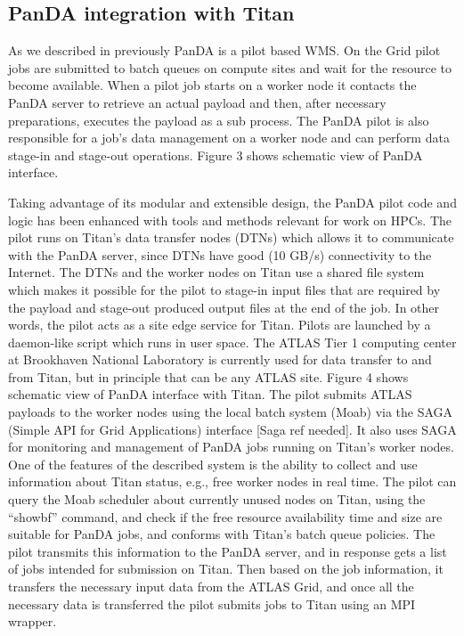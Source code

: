 \subsection{PanDA integration with Titan}
\label{subsec:integration}

As we described in previously PanDA is a pilot based WMS. On the Grid pilot
jobs are submitted to batch queues on compute sites and wait for the resource
to become available. When a pilot job starts on a worker node it contacts the
PanDA server to retrieve an actual payload and then, after necessary
preparations, executes the payload as a sub process. The PanDA pilot is also
responsible for a job's data management on a worker node and can perform data
stage-in and stage-out operations. Figure 3 shows schematic view of PanDA
interface.

Taking advantage of its modular and extensible design, the PanDA pilot code and
logic has been enhanced with tools and methods relevant for work on HPCs. The
pilot runs on Titan's data transfer nodes (DTNs) which allows it to communicate
with the PanDA server, since DTNs have good (10 GB/s) connectivity to the
Internet. The DTNs and the worker nodes on Titan use a shared file system which
makes it possible for the pilot to stage-in input files that are required by
the payload and stage-out produced output files at the end of the job. In other
words, the pilot acts as a site edge service for Titan. Pilots are launched by
a daemon-like script which runs in user space. The ATLAS Tier 1 computing
center at Brookhaven National Laboratory is currently used for data transfer to
and from Titan, but in principle that can be any ATLAS site. Figure 4 shows
schematic view of PanDA interface with Titan.
The pilot submits ATLAS payloads to the worker nodes using the local batch
system (Moab) via the SAGA (Simple API for Grid Applications) interface [Saga
ref needed]. It also uses SAGA for monitoring and management of PanDA jobs
running on Titan's worker nodes. One of the features of the described system is
the ability to collect and use information about Titan status, e.g., free
worker nodes in real time. The pilot can query the Moab scheduler about
currently unused nodes on Titan, using the ``showbf'' command, and check if the
free resource availability time and size are suitable for PanDA jobs, and
conforms with Titan's batch queue policies. The pilot transmits this
information to the PanDA server, and in response gets a list of jobs intended
for submission on Titan. Then based on the job information, it transfers the
necessary input data from the ATLAS Grid, and once all the necessary data is
transferred the pilot submits jobs to Titan using an MPI wrapper.

